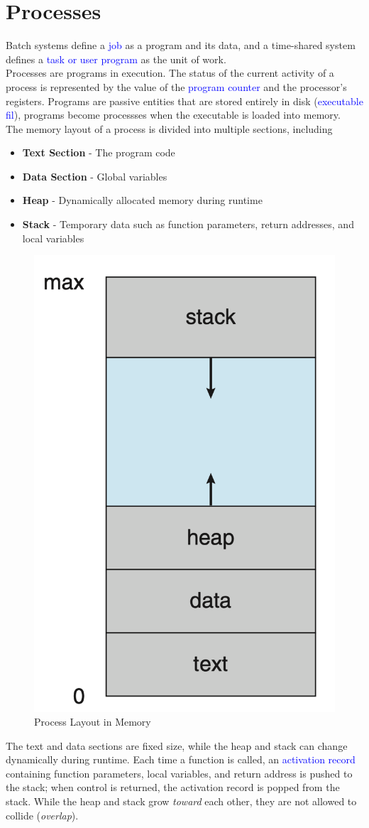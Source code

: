 \documentclass{book/custombook}
\begin{document}
    \chapter{Processes}
        Batch systems define a \textcolor{blue}{job} as a program and its data, and a time-shared system defines a \textcolor{blue}{task or user program}
        as the unit of work.\\
        Processes are programs in execution. The status of the current activity of a process is represented by the value of 
        the \textcolor{blue}{program counter} and the processor's registers. Programs are passive entities that are stored entirely in
        disk (\textcolor{blue}{executable fil}), programs become processses when the executable is loaded into memory.\\
        The memory layout of a process is divided into multiple sections, including
        \begin{itemize}
            \item \textbf{Text Section} - The program code
            \item \textbf{Data Section} - Global variables
            \item \textbf{Heap} - Dynamically allocated memory during runtime
            \item \textbf{Stack} - Temporary data such as function parameters, return addresses, and local variables
        \end{itemize}
        \begin{figure}[H]
            \centering
            \includegraphics[width=0.2\linewidth]{figures/process_layout.png}
            \caption{Process Layout in Memory}
        \end{figure}
        The text and data sections are fixed size, while the heap and stack can change dynamically during runtime.
        Each time a function is called, an \textcolor{blue}{activation record} containing function parameters, local variables,
        and return address is pushed to the stack; when control is returned, the activation record is popped from the stack.
        While the heap and stack grow \textit{toward} each other, they are not allowed to collide (\textit{overlap}).\\
\end{document}
